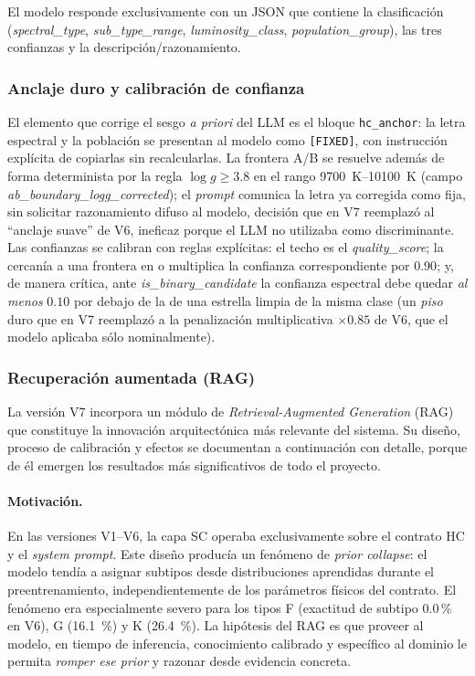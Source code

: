 El modelo responde exclusivamente con un JSON que contiene la clasificación
(\emph{spectral\_type}, \emph{sub\_type\_range}, \emph{luminosity\_class},
\emph{population\_group}), las tres confianzas y la descripción/razonamiento.

\subsubsection{Anclaje duro y calibración de confianza}
\label{sec:sc-anclaje}

El elemento que corrige el sesgo \emph{a priori} del LLM es el bloque
\verb|hc_anchor|: la letra espectral y la población se presentan al modelo como
\texttt{[FIXED]}, con instrucción explícita de copiarlas sin recalcularlas. La
frontera A/B se resuelve además de forma determinista por la regla $\log g \ge 3.8$
en el rango \SIrange{9700}{10100}{\kelvin} (campo
\emph{ab\_boundary\_logg\_corrected}); el \emph{prompt} comunica la letra ya
corregida como fija, sin solicitar razonamiento difuso al modelo, decisión que
en V7 reemplazó al ``anclaje suave'' de V6, ineficaz porque el LLM no utilizaba
\logg{} como discriminante. Las confianzas se calibran con reglas explícitas: el
techo es el \emph{quality\_score}; la cercanía a una frontera en \teff{} o \logg{}
multiplica la confianza correspondiente por $0.90$; y, de manera crítica, ante
\emph{is\_binary\_candidate} la confianza espectral debe quedar \emph{al menos}
$0.10$ por debajo de la de una estrella limpia de la misma clase (un \emph{piso}
duro que en V7 reemplazó a la penalización multiplicativa $\times 0.85$ de V6, que
el modelo aplicaba sólo nominalmente).

\subsubsection{Recuperación aumentada (RAG)}
\label{sec:sc-rag}

La versión V7 incorpora un módulo de \emph{Retrieval-Augmented Generation} (RAG)
que constituye la innovación arquitectónica más relevante del sistema. Su diseño,
proceso de calibración y efectos se documentan a continuación con detalle, porque
de él emergen los resultados más significativos de todo el proyecto.

\paragraph{Motivación.} En las versiones V1--V6, la capa SC operaba exclusivamente
sobre el contrato HC y el \emph{system prompt}. Este diseño producía un fenómeno
de \emph{prior collapse}: el modelo tendía a asignar subtipos desde distribuciones
aprendidas durante el preentrenamiento, independientemente de los parámetros
físicos del contrato. El fenómeno era especialmente severo para los tipos F
(exactitud de subtipo 0.0\,\% en V6), G (\SI{16.1}{\percent}) y K
(\SI{26.4}{\percent}). La hipótesis del RAG es que proveer al modelo, en tiempo de
inferencia, conocimiento calibrado y específico al dominio le permita \emph{romper
ese prior} y razonar desde evidencia concreta.

